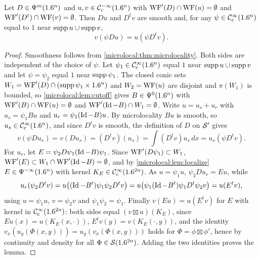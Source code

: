 \begin{lemma}\label{microlocal:lem:transpose}
  Let $D\in\Psi^{m}(1.6^n)$ and $u,v\in\mathcal{C}^{-\infty}_{\mathrm{c}}(1.6^n)$ with
  $\operatorname{WF}'(D)\cap\operatorname{WF}(u)=\emptyset$ and $\operatorname{WF}'(D^t)\cap\operatorname{WF}(v)=\emptyset$. Then
  $Du$ and $D^tv$ are smooth and, for any $\psi\in\mathcal{C}^\infty_{\mathrm{c}}(1.6^n)$ equal to $1$
  near $\operatorname{supp} u\cup\operatorname{supp} v$,
  \begin{equation*}
    v(\psi Du)=u(\psi D^tv).
  \end{equation*}
\end{lemma}
\begin{proof}
  Smoothness follows from \cref{microlocal:thm:microlocality}. Both sides
  are independent of the choice of $\psi$. Let $\psi_1\in\mathcal{C}^\infty_{\mathrm{c}}(1.6^n)$ equal $1$
  near $\operatorname{supp} u\cup\operatorname{supp} v$ and let $\psi=\psi_2$ equal $1$ near
  $\operatorname{supp}\psi_1$. The closed conic sets
  $W_1=\operatorname{WF}'(D)\cap(\operatorname{supp}\psi_1\times1.6^n)$ and $W_2=\operatorname{WF}(u)$ are disjoint and
  $\pi(W_1)$ is bounded, so \cref{microlocal:lem:cutoff} gives
  $B\in\Psi^{0}(1.6^n)$ with $\operatorname{WF}'(B)\cap\operatorname{WF}(u)=\emptyset$ and
  $\operatorname{WF}'(\operatorname{Id}-B)\cap W_1=\emptyset$. Write $u=u_s+u_r$ with
  $u_s=\psi_1Bu$ and $u_r=\psi_1(\operatorname{Id}-B)u$. By microlocality $Bu$ is smooth, so
  $u_s\in\mathcal{C}^\infty_{\mathrm{c}}(1.6^n)$, and since $D^tv$ is smooth, the definition of $D$ on
  $\mathcal{S}'$ gives
  \begin{equation*}
    v(\psi Du_s)=v(Du_s)=(D^tv)(u_s)=\int(D^tv)u_s\,dx=u_s(\psi D^tv).
  \end{equation*}
  For $u_r$, let $E=\psi_2D\psi_1(\operatorname{Id}-B)\psi_1$. Since
  $\operatorname{WF}'(D\psi_1)\subset W_1$, $\operatorname{WF}'(E)\subset W_1\cap\operatorname{WF}'(\operatorname{Id}-B)=\emptyset$, and
  by \cref{microlocal:lem:localize} $E\in\Psi^{-\infty}(1.6^n)$ with kernel
  $K_E\in\mathcal{C}^\infty_{\mathrm{c}}(1.6^{2n})$. As $u=\psi_1u$, $\psi_2Du_r=Eu$, while
  \begin{equation*}
    u_r(\psi_2D^tv)=u\bigl((\operatorname{Id}-B^t)\psi_1\psi_2D^tv\bigr)
    =u\bigl(\psi_1(\operatorname{Id}-B^t)\psi_1D^t\psi_2v\bigr)=u(E^tv),
  \end{equation*}
  using $u=\psi_1u$, $v=\psi_2v$ and $\psi_1\psi_2=\psi_1$. Finally
  $v(Eu)=u(E^tv)$ for $E$ with kernel in $\mathcal{C}^\infty_{\mathrm{c}}(1.6^{2n})$: both sides equal
  $(v\boxtimes u)(K_E)$, since $Eu(x)=u(K_E(x,\cdot))$,
  $E^tv(y)=v(K_E(\cdot,y))$, and the identity
  $v_x(u_y(\Phi(x,y)))=u_y(v_x(\Phi(x,y)))$ holds for $\Phi=\phi\boxtimes\phi'$,
  hence by continuity and density for all $\Phi\in\mathcal{S}(1.6^{2n})$. Adding the
  two identities proves the lemma.
\end{proof}

